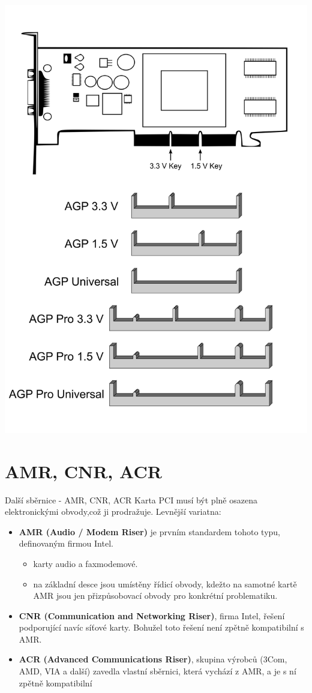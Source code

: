 \documentclass[aspectratio=43]{beamer}
\begin{document}
\begin{frame}{}
	 
	\begin{center}
		\includegraphics[width=0.55\linewidth]{extrahovane_obrazky/agp_k.png}
	\end{center}
	
\end{frame}

\section{AMR, CNR, ACR}
\begin{frame}{Další sběrnice - AMR, CNR, ACR}
	Karta PCI musí být plně osazena elektronickými obvody,což ji prodražuje. Levnější variatna:
	\begin{itemize}
		\item \textbf{AMR (Audio / Modem Riser)} je prvním standardem
		      tohoto typu, definovaným firmou Intel.
		      \begin{itemize}
		      	\item karty audio a faxmodemové.
		      	\item na základní desce jsou umístěny řídicí obvody, kdežto na samotné kartě AMR jsou jen přizpůsobovací obvody pro
		      	      konkrétní problematiku.
		      \end{itemize}
		\item \textbf{CNR (Communication and Networking Riser)}, firma Intel, řešení podporující navíc síťové karty. Bohužel toto řešení není zpětně kompatibilní s AMR.
		\item \textbf{ACR (Advanced Communications Riser)}, skupina výrobců (3Com, AMD, VIA a další) zavedla vlastní sběrnici, která vychází z AMR, a je s ní zpětně kompatibilní
	\end{itemize}
	
\end{frame}
\end{document}
